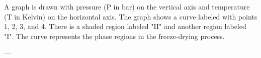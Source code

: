A graph is drawn with pressure (P in bar) on the vertical axis and temperature (T in Kelvin) on the horizontal axis. The graph shows a curve labeled with points 1, 2, 3, and 4. There is a shaded region labeled "II" and another region labeled "I". The curve represents the phase regions in the freeze-drying process.

---